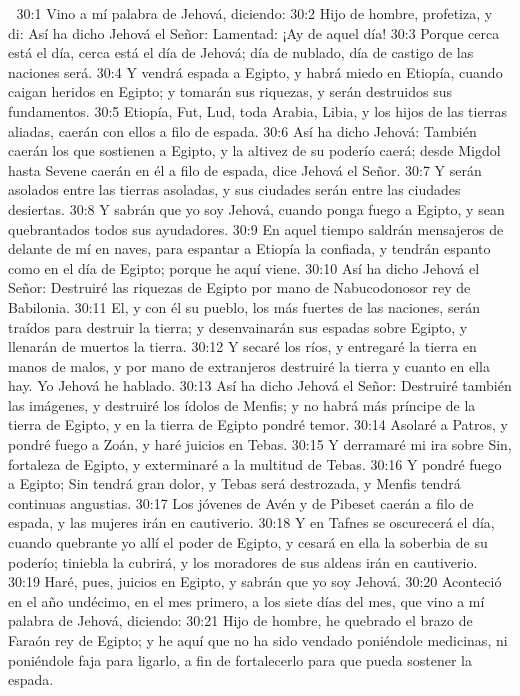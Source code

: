 
30:1 Vino a mí palabra de Jehová, diciendo:  
30:2 Hijo de hombre, profetiza, y di: Así ha dicho Jehová el Señor: Lamentad: ¡Ay de aquel día!  
30:3 Porque cerca está el día, cerca está el día de Jehová; día de nublado, día de castigo de las naciones será.  
30:4 Y vendrá espada a Egipto, y habrá miedo en Etiopía, cuando caigan heridos en Egipto; y tomarán sus riquezas, y serán destruidos sus fundamentos.  
30:5 Etiopía, Fut, Lud, toda Arabia, Libia, y los hijos de las tierras aliadas, caerán con ellos a filo de espada.  
30:6 Así ha dicho Jehová: También caerán los que sostienen a Egipto, y la altivez de su poderío caerá; desde Migdol hasta Sevene caerán en él a filo de espada, dice Jehová el Señor.  
30:7 Y serán asolados entre las tierras asoladas, y sus ciudades serán entre las ciudades desiertas.  
30:8 Y sabrán que yo soy Jehová, cuando ponga fuego a Egipto, y sean quebrantados todos sus ayudadores.  
30:9 En aquel tiempo saldrán mensajeros de delante de mí en naves, para espantar a Etiopía la confiada, y tendrán espanto como en el día de Egipto; porque he aquí viene.  
30:10 Así ha dicho Jehová el Señor: Destruiré las riquezas de Egipto por mano de Nabucodonosor rey de Babilonia.  
30:11 El, y con él su pueblo, los más fuertes de las naciones, serán traídos para destruir la tierra; y desenvainarán sus espadas sobre Egipto, y llenarán de muertos la tierra.  
30:12 Y secaré los ríos, y entregaré la tierra en manos de malos, y por mano de extranjeros destruiré la tierra y cuanto en ella hay. Yo Jehová he hablado.  
30:13 Así ha dicho Jehová el Señor: Destruiré también las imágenes, y destruiré los ídolos de Menfis; y no habrá más príncipe de la tierra de Egipto, y en la tierra de Egipto pondré temor.  
30:14 Asolaré a Patros, y pondré fuego a Zoán, y haré juicios en Tebas.  
30:15 Y derramaré mi ira sobre Sin, fortaleza de Egipto, y exterminaré a la multitud de Tebas.  
30:16 Y pondré fuego a Egipto; Sin tendrá gran dolor, y Tebas será destrozada, y Menfis tendrá continuas angustias.  
30:17 Los jóvenes de Avén y de Pibeset caerán a filo de espada, y las mujeres irán en cautiverio.  
30:18 Y en Tafnes se oscurecerá el día, cuando quebrante yo allí el poder de Egipto, y cesará en ella la soberbia de su poderío; tiniebla la cubrirá, y los moradores de sus aldeas irán en cautiverio.  
30:19 Haré, pues, juicios en Egipto, y sabrán que yo soy Jehová.  
30:20 Aconteció en el año undécimo, en el mes primero, a los siete días del mes, que vino a mí palabra de Jehová, diciendo:  
30:21 Hijo de hombre, he quebrado el brazo de Faraón rey de Egipto; y he aquí que no ha sido vendado poniéndole medicinas, ni poniéndole faja para ligarlo, a fin de fortalecerlo para que pueda sostener la espada.  
